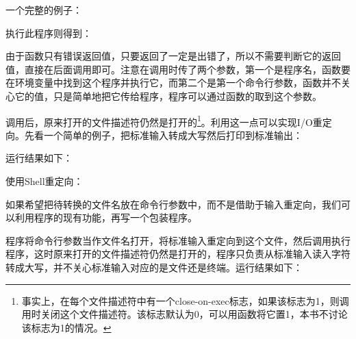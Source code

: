 一个完整的例子：




执行此程序则得到：




由于函数只有错误返回值，只要返回了一定是出错了，所以不需要判断它的返回值，直接在后面调用即可。注意在调用时传了两个参数，第一个是程序名，函数要在环境变量中找到这个程序并执行它，而第二个是第一个命令行参数，函数并不关心它的值，只是简单地把它传给程序，程序可以通过函数的取到这个参数。



调用后，原来打开的文件描述符仍然是打开的\footnote[37]{事实上，在每个文件描述符中有一个close-on-exec标志，如果该标志为1，则调用时关闭这个文件描述符。该标志默认为0，可以用函数将它置1，本书不讨论该标志为1的情况。}。利用这一点可以实现I/\BookSplit{}O重定向。先看一个简单的例子，把标准输入转成大写然后打印到标准输出：





运行结果如下：




使用Shell重定向：




如果希望把待转换的文件名放在命令行参数中，而不是借助于输入重定向，我们可以利用程序的现有功能，再写一个包装程序。





程序将命令行参数当作文件名打开，将标准输入重定向到这个文件，然后调用执行程序，这时原来打开的文件描述符仍然是打开的，程序只负责从标准输入读入字符转成大写，并不关心标准输入对应的是文件还是终端。运行结果如下：


